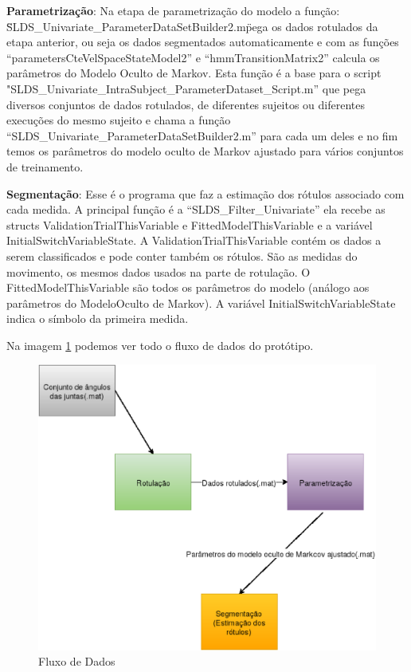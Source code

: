 \begin{itemize}
\begin{sloppypar}
  \item \textbf{Parametrização}: Na etapa de parametrização do modelo a função:
   \"SLDS\_Univariate\_ParameterDataSetBuilder2.m\" pega os dados rotulados da etapa
  anterior, ou seja os dados segmentados automaticamente e com as funções
  “parametersCteVelSpaceStateModel2” e “hmmTransitionMatrix2” calcula os parâmetros
  do Modelo Oculto de Markov. Esta função é a base para o script
  "SLDS\_Univariate\_IntraSubject\_ParameterDataset\_Script.m”  que pega diversos
   conjuntos de dados rotulados, de diferentes sujeitos ou diferentes execuções
  do mesmo sujeito e chama a função “SLDS\_Univariate\_ParameterDataSetBuilder2.m”
   para cada um deles e no fim temos os parâmetros do modelo oculto de Markov ajustado
   para vários conjuntos de treinamento.

  \end{sloppypar}
  \item \textbf{Segmentação}: Esse é o programa que faz a estimação dos rótulos associado com cada medida.
  A principal função é a “SLDS\_Filter\_Univariate” ela recebe as structs
  ValidationTrialThisVariable e FittedModelThisVariable e a variável
  InitialSwitchVariableState. A ValidationTrialThisVariable contém os dados a serem
   classificados e pode conter também os rótulos. São as medidas do movimento, os
  mesmos dados usados na parte de rotulação. O FittedModelThisVariable são todos
  os parâmetros do modelo (análogo aos parâmetros do ModeloOculto de Markov).
  A variável InitialSwitchVariableState indica o símbolo da primeira medida.

  Na imagem \ref{diagramProt} podemos ver todo o fluxo de dados do protótipo.
  \end{itemize}

  \begin{figure}[H]
  \centering
  \includegraphics [keepaspectratio=true,scale=0.60]{figuras/diagramProt.eps}
  \caption{Fluxo de Dados}
  \label{diagramProt}

  \end{figure}


